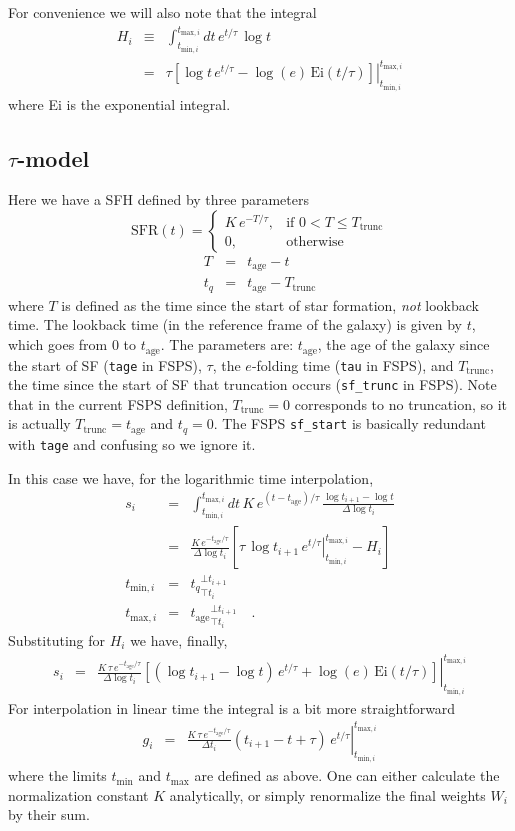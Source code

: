 \documentclass[12pt, letterpaper, preprint]{aastex}
\newcommand{\tmin}[1][]{t_{\mathrm{min} #1}}
\newcommand{\tmax}[1][]{t_{\mathrm{max} #1}}
\newcommand{\dlt}{\Delta\log t_i}
\newcommand{\dt}{\Delta t_i}
\newcommand{\tintegral}{\int_{\tmin[,i]}^{\tmax[,i]} dt}
\newcommand{\tinterval}{\right|_{\tmin[,i]}^{\tmax[,i]}}
\newcommand{\clip}[3][]{{#1}_{\top {#2}}^{\bot {#3}}}
\newcommand{\sftrunc}{T_{\mathrm{trunc}}}
\newcommand{\tage}{t_{\mathrm{age}}}
\begin{document}
For convenience we will also note that the integral
\begin{eqnarray}
H_i & \equiv & \tintegral \, e^{t/\tau} \, \log t \nonumber \\
  & = & \left. \tau \left[ \log t \, e^{t/\tau} - \log(e) \, \mathrm{Ei}(t/\tau) \right]\tinterval
\end{eqnarray}
where Ei is the exponential integral.

\subsection{$\tau$-model}
Here we have a SFH defined by three parameters
\[ 
\mathrm{SFR}(t) = 
\begin{cases}
K \, e^{-T/\tau}, &  \text{if } 0 < T \leq \sftrunc \\
0, & \text{otherwise}
\end{cases}
\]
\begin{eqnarray}
T & = & \tage - t \nonumber \\
t_q & = & \tage - \sftrunc \nonumber 
\end{eqnarray}
where $T$ is defined as the time since the start of star formation, \emph{not} lookback time.  
The lookback time  (in the reference frame of the galaxy) is given by $t$, which goes from 0 to $\tage$.
The parameters are: 
$\tage$, the age of the galaxy since the start of SF (\texttt{tage} in FSPS), 
$\tau$, the $e$-folding time (\texttt{tau} in FSPS), and
$\sftrunc$, the time since the start of SF that truncation occurs (\texttt{sf\_trunc} in FSPS).
Note that in the current FSPS definition, $\sftrunc = 0$ corresponds to no truncation, so it is actually $\sftrunc= \tage$ and $t_q=0$.
The FSPS \texttt{sf\_start} is basically redundant with \texttt{tage} and confusing so we ignore it.

In this case we have, for the logarithmic time interpolation,
\begin{eqnarray}
s_i  & = & \tintegral \, K \, e^{(t-\tage) /\tau}\, \frac{\log t_{i+1} - \log t}{\dlt} \nonumber \\
      & = & \frac{K \, e^{-\tage/\tau}}{\dlt} \left[ \left. \tau \, \log t_{i+1} \, e^{t/\tau} \tinterval -  H_i\right] \nonumber \\
\tmin[,i] & = & \clip[t_q]{t_i}{t_{i+1}} \nonumber \\
\tmax[,i] & = & \clip[\tage]{t_i}{t_{i+1}} \quad . \nonumber
\end{eqnarray}
Substituting for $H_i$ we have, finally, 
\begin{eqnarray}
s_i & = & \left. \frac{K \, \tau \, e^{-\tage/\tau}}{\dlt} \left [(\log t_{i+1} - \log t)\, e^{t/\tau} + 
          \log(e) \, \mathrm{Ei}(t/\tau)\right]  \tinterval
\end{eqnarray}
For interpolation in linear time the integral is a bit more straightforward
\begin{eqnarray}
g_i & = & \left. \frac{K \, \tau \, e^{-\tage/\tau}}{\dt} (t_{i+1} - t + \tau)\, e^{t/\tau} \tinterval
\end{eqnarray}
where the limits $\tmin$ and $\tmax$ are defined as above.
One can either calculate the normalization constant $K$ analytically, or simply renormalize the final weights $W_i$ by their sum.
\end{document}
